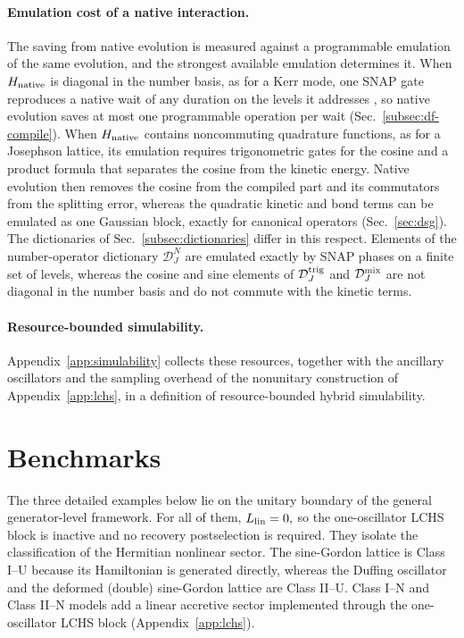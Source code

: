 \documentclass[pra,twocolumn,superscriptaddress,nofootinbib,floatfix]{revtex4-2}
\theoremstyle{remark}
\begin{document}
\paragraph{Emulation cost of a native interaction.}
The saving from native evolution is measured against a programmable emulation of the same evolution, and the strongest available emulation determines it. When \(H_{\rm native}\) is diagonal in the number basis, as for a Kerr mode, one SNAP gate reproduces a native wait of any duration on the levels it addresses \cite{Krastanov_2015,Heeres_2015}, so native evolution saves at most one programmable operation per wait (Sec.~\ref{subsec:df-compile}). When \(H_{\rm native}\) contains noncommuting quadrature functions, as for a Josephson lattice, its emulation requires trigonometric gates for the cosine and a product formula that separates the cosine from the kinetic energy. Native evolution then removes the cosine from the compiled part and its commutators from the splitting error, whereas the quadratic kinetic and bond terms can be emulated as one Gaussian block, exactly for canonical operators (Sec.~\ref{sec:dsg}). The dictionaries of Sec.~\ref{subsec:dictionaries} differ in this respect. Elements of the number-operator dictionary \(\mathcal D_J^{N}\) are emulated exactly by SNAP phases on a finite set of levels, whereas the cosine and sine elements of \(\mathcal D_J^{\rm trig}\) and \(\mathcal D_J^{\rm mix}\) are not diagonal in the number basis and do not commute with the kinetic terms.

\paragraph{Resource-bounded simulability.}
Appendix~\ref{app:simulability} collects these resources, together with the ancillary oscillators and the sampling overhead of the nonunitary construction of Appendix~\ref{app:lchs}, in a definition of resource-bounded hybrid simulability.

\section{Benchmarks}
\label{sec:benchmarks}

The three detailed examples below lie on the unitary boundary of the general generator-level framework. For all of them, $L_{\rm lin}=0,$ so the one-oscillator LCHS block is inactive and no recovery postselection is required. They isolate the classification of the Hermitian nonlinear sector. The sine-Gordon lattice is Class I--U because its Hamiltonian is generated directly, whereas the Duffing oscillator and the deformed (double) sine-Gordon lattice are Class II--U. Class I--N and Class II--N models add a linear accretive sector implemented through the one-oscillator LCHS block (Appendix~\ref{app:lchs}).
\end{document}
